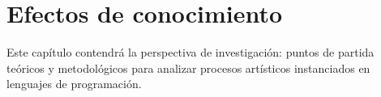 \chapter{Efectos de conocimiento}

Este capítulo contendrá la perspectiva de investigación: puntos de partida teóricos y metodológicos para analizar procesos artísticos instanciados en lenguajes de programación. 
